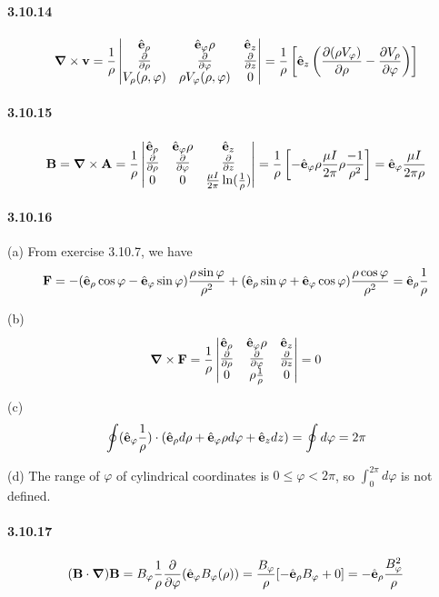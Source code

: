 \documentclass[a4paper]{article}
\begin{document}
\paragraph{3.10.14}
\[
\boldsymbol{\nabla}\times\mathbf{v}=\frac{1}{\rho}
\begin{vmatrix}
\hat{\mathbf{e}}_\rho&\hat{\mathbf{e}}_\varphi\rho&\hat{\mathbf{e}}_z\\
\frac{\partial}{\partial\rho}&\frac{\partial}{\partial\varphi}&\frac{\partial}{\partial z}\\
V_\rho(\rho,\varphi)&\rho V_\varphi(\rho,\varphi)&0
\end{vmatrix}
=\frac{1}{\rho}\left[\hat{\mathbf{e}}_z\left(\frac{\partial(\rho V_\varphi)}{\partial\rho}-\frac{\partial V_\rho}{\partial\varphi}\right) \right]
\]

\paragraph{3.10.15}
\[
\mathbf{B}=\boldsymbol{\nabla}\times\mathbf{A}=\frac{1}{\rho}
\begin{vmatrix}
\hat{\mathbf{e}}_\rho&\hat{\mathbf{e}}_\varphi\rho&\hat{\mathbf{e}}_z\\
\frac{\partial}{\partial\rho}&\frac{\partial}{\partial\varphi}&\frac{\partial}{\partial z}\\
0&0&\frac{\mu I}{2\pi}\ln(\frac{1}{\rho})
\end{vmatrix}
=\frac{1}{\rho}\left[-\hat{\mathbf{e}}_\varphi\rho\frac{\mu I}{2\pi}\rho\frac{-1}{\rho^2} \right]=\hat{\mathbf{e}}_\varphi\frac{\mu I}{2\pi\rho}
\]

\paragraph{3.10.16}
(a) From exercise 3.10.7, we have
\[
\mathbf{F}=-(\hat{\mathbf{e}}_\rho\cos\varphi-\hat{\mathbf{e}}_\varphi\sin\varphi)\frac{\rho\sin\varphi}{\rho^2}+(\hat{\mathbf{e}}_\rho\sin\varphi+\hat{\mathbf{e}}_\varphi\cos\varphi)\frac{\rho\cos\varphi}{\rho^2}=\hat{\mathbf{e}}_\rho\frac{1}{\rho}
\]

(b) 
\[
\boldsymbol{\nabla}\times\mathbf{F}=\frac{1}{\rho}
\begin{vmatrix}
\hat{\mathbf{e}}_\rho&\hat{\mathbf{e}}_\varphi\rho&\hat{\mathbf{e}}_z\\
\frac{\partial}{\partial\rho}&\frac{\partial}{\partial\varphi}&\frac{\partial}{\partial z}\\
0&\rho\frac{1}{\rho}&0
\end{vmatrix}
=0
\]

(c)
\[
\oint(\hat{\mathbf{e}}_\varphi\frac{1}{\rho})\cdot(\hat{\mathbf{e}}_\rho d\rho+\hat{\mathbf{e}}_\varphi\rho d\varphi+\hat{\mathbf{e}}_z dz)=\oint d\varphi=2\pi
\]

(d) The range of $\varphi$ of cylindrical coordinates is $0\leq\varphi<2\pi$, so $\int_0^{2\pi}d\varphi$ is not defined.

\paragraph{3.10.17}
\[
(\mathbf{B}\cdot\boldsymbol{\nabla})\mathbf{B}=B_\varphi\frac{1}{\rho}\frac{\partial}{\partial\varphi}(\hat{\mathbf{e}}_\varphi B_\varphi(\rho))=\frac{B_\varphi}{\rho}[-\hat{\mathbf{e}}_\rho B_\varphi+0]=-\hat{\mathbf{e}}_\rho\frac{B_\varphi^2}{\rho}
\]
\end{document}
